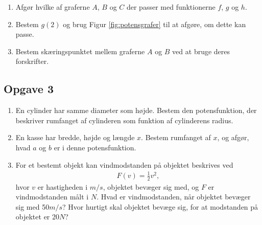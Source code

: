 \begin{enumerate}[label=\roman*)]
	\item Afgør hvilke af graferne $A$, $B$ og $C$ der passer med funktionerne $f$, $g$ og $h$.
	\item Bestem $g(2)$ og brug Figur \ref{fig:potensgrafer} til at afgøre, om dette kan passe.
	\item Bestem skæringspunktet mellem graferne $A$ og $B$ ved at bruge deres forskrifter.
\end{enumerate}

\subsection*{Opgave 3}

\begin{enumerate}[label=\roman*)]
\item En cylinder har samme diameter som højde. Bestem den potensfunktion, der beskriver rumfanget af cylinderen som funktion af cylinderens radius. 
\item En kasse har bredde, højde og længde $x$. Bestem rumfanget af $x$, og afgør, hvad $a$ og $b$ er i denne potensfunktion.
\item For et bestemt objekt kan vindmodstanden på objektet beskrives ved 
\begin{align*}
F(v)= \frac{1}{2}v^2,
\end{align*}
hvor $v$ er hastigheden i $m/s$, objektet bevæger sig med, og $F$ er vindmodstanden målt i $N$. Hvad er vindmodstanden, når objektet bevæger sig med 50$m/s$? Hvor hurtigt skal objektet bevæge sig, for at modstanden på objektet er 20$N$?
\end{enumerate}
        
